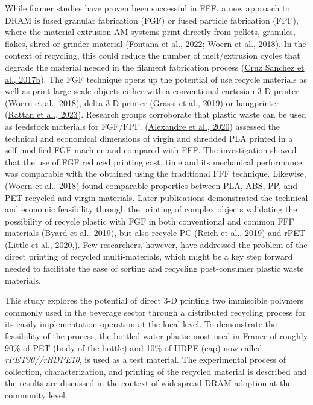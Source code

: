 \documentclass[
  12pt,
  number,
  review]{elsarticle}
\begin{document}
While former studies have proven been successful in FFF, a new approach
to DRAM is fused granular fabrication (FGF) or fused particle
fabrication (FPF), where the material-extrusion AM systems print
directly from pellets, granules, flakes, shred or grinder material
(\protect\hyperlink{ref-fontana2022}{Fontana et al., 2022};
\protect\hyperlink{ref-woern2018}{Woern et al., 2018}). In the context
of recycling, this could reduce the number of melt/extrusion cycles that
degrade the material needed in the filament fabrication process
(\protect\hyperlink{ref-cruzsanchez2017a}{Cruz Sanchez et al., 2017b}).
The FGF technique opens up the potential of use recycle materials as
well as print large-scale objects either with a conventional cartesian
3-D printer (\protect\hyperlink{ref-woern2018}{Woern et al., 2018}),
delta 3-D printer (\protect\hyperlink{ref-grassi2019}{Grassi et al.,
2019}) or hangprinter (\protect\hyperlink{ref-rattan2023}{Rattan et al.,
2023}). Research groups corroborate that plastic waste can be used as
feedstock materials for FGF/FPF.
(\protect\hyperlink{ref-alexandre2020}{Alexandre et al., 2020}) assessed
the technical and economical dimensions of virgin and shredded PLA
printed in a self-modified FGF machine and compared with FFF. The
investigation showed that the use of FGF reduced printing cost, time and
its mechanical performance was comparable with the obtained using the
traditional FFF technique. Likewise,
(\protect\hyperlink{ref-woern2018}{Woern et al., 2018}) found comparable
properties between PLA, ABS, PP, and PET recycled and virgin materials.
Later publications demonstrated the technical and economic feasibility
through the printing of complex objects validating the possibility of
recycle plastic with FGF in both conventional and common FFF materials
(\protect\hyperlink{ref-byard2019}{Byard et al., 2019}), but also
recycle PC (\protect\hyperlink{ref-reich2019b}{Reich et al., 2019}) and
rPET (\protect\hyperlink{ref-little2020}{Little et al., 2020},). Few
researchers, however, have addressed the problem of the direct printing
of recycled multi-materials, which might be a key step forward needed to
facilitate the ease of sorting and recycling post-consumer plastic waste
materials.

This study explores the potential of direct 3-D printing two immiscible
polymers commonly used in the beverage sector through a distributed
recycling process for its easily implementation operation at the local
level. To demonstrate the feasibility of the process, the bottled water
plastic most used in France of roughly 90\% of PET (body of the bottle)
and 10\% of HDPE (cap) now called \emph{rPET90//rHDPE10}, is used as a
test material. The experimental process of collection, characterization,
and printing of the recycled material is described and the results are
discussed in the context of widespread DRAM adoption at the community
level.
\end{document}

